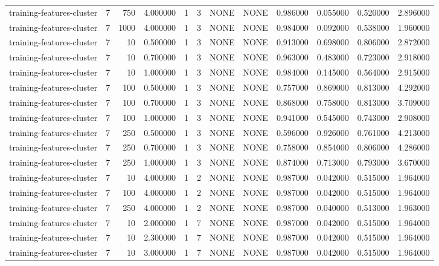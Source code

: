 \begin{tabular}{lrrrllllrrrr}
training-features-cluster & 7 & 750 & 4.000000 & 1 & 3 & NONE & NONE & 0.986000 & 0.055000 & 0.520000 & 2.896000 \\
training-features-cluster & 7 & 1000 & 4.000000 & 1 & 3 & NONE & NONE & 0.984000 & 0.092000 & 0.538000 & 1.960000 \\
training-features-cluster & 7 & 10 & 0.500000 & 1 & 3 & NONE & NONE & 0.913000 & 0.698000 & 0.806000 & 2.872000 \\
training-features-cluster & 7 & 10 & 0.700000 & 1 & 3 & NONE & NONE & 0.963000 & 0.483000 & 0.723000 & 2.918000 \\
training-features-cluster & 7 & 10 & 1.000000 & 1 & 3 & NONE & NONE & 0.984000 & 0.145000 & 0.564000 & 2.915000 \\
training-features-cluster & 7 & 100 & 0.500000 & 1 & 3 & NONE & NONE & 0.757000 & 0.869000 & 0.813000 & 4.292000 \\
training-features-cluster & 7 & 100 & 0.700000 & 1 & 3 & NONE & NONE & 0.868000 & 0.758000 & 0.813000 & 3.709000 \\
training-features-cluster & 7 & 100 & 1.000000 & 1 & 3 & NONE & NONE & 0.941000 & 0.545000 & 0.743000 & 2.908000 \\
training-features-cluster & 7 & 250 & 0.500000 & 1 & 3 & NONE & NONE & 0.596000 & 0.926000 & 0.761000 & 4.213000 \\
training-features-cluster & 7 & 250 & 0.700000 & 1 & 3 & NONE & NONE & 0.758000 & 0.854000 & 0.806000 & 4.286000 \\
training-features-cluster & 7 & 250 & 1.000000 & 1 & 3 & NONE & NONE & 0.874000 & 0.713000 & 0.793000 & 3.670000 \\
training-features-cluster & 7 & 10 & 4.000000 & 1 & 2 & NONE & NONE & 0.987000 & 0.042000 & 0.515000 & 1.964000 \\
training-features-cluster & 7 & 100 & 4.000000 & 1 & 2 & NONE & NONE & 0.987000 & 0.042000 & 0.515000 & 1.964000 \\
training-features-cluster & 7 & 250 & 4.000000 & 1 & 2 & NONE & NONE & 0.987000 & 0.040000 & 0.513000 & 1.963000 \\
training-features-cluster & 7 & 10 & 2.000000 & 1 & 7 & NONE & NONE & 0.987000 & 0.042000 & 0.515000 & 1.964000 \\
training-features-cluster & 7 & 10 & 2.300000 & 1 & 7 & NONE & NONE & 0.987000 & 0.042000 & 0.515000 & 1.964000 \\
training-features-cluster & 7 & 10 & 3.000000 & 1 & 7 & NONE & NONE & 0.987000 & 0.042000 & 0.515000 & 1.964000 \\

\end{tabular}
